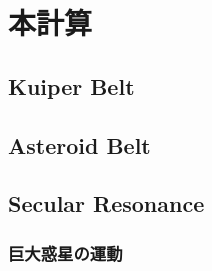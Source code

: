 \documentclass[11pt,a4paper,oneside,onecolumn]{jarticle}
\begin{document}
\section{本計算}
\subsection{Kuiper Belt}



\subsection{Asteroid Belt}



\subsection{Secular Resonance}

\subsubsection{巨大惑星の運動}
\end{document}
